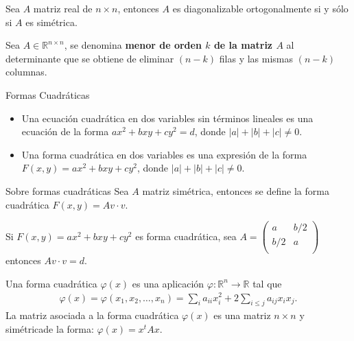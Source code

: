 \begin{Teo}
Sea $A$ matriz real de $n\times n$, entonces $A$ es diagonalizable ortogonalmente si y s\'olo si $A$ es sim\'etrica.
\end{Teo}


\begin{Def}
Sea $A\in\mathbb{R}^{n\times n}$, se denomina \textbf{menor de orden $k$ de la matriz $A$} al determinante que se obtiene de eliminar $\left(n-k\right)$ filas y las mismas $\left(n-k\right)$ columnas.
\end{Def}


\begin{Def} Formas Cuadr\'aticas
\begin{itemize}
\item[i) ] Una ecuaci\'on cuadr\'atica en dos variables sin t\'erminos lineales es una ecuaci\'on de la forma $ax^{2}+bxy+cy^{2}=d$, donde $|a|+|b|+|c|\neq0$.

\item[ii) ] Una forma cuadr\'atica en dos variables es una expresi\'on de la forma $F\left(x,y\right)=ax^{2}+bxy+cy^{2}$, donde $|a|+|b|+|c|\neq0$.
\end{itemize}
\end{Def}


\begin{Def} Sobre formas cuadr\'aticas
Sea $A$ matriz sim\'etrica, entonces se define la forma cuadr\'atica $F\left(x,y\right)=Av\cdot v$.
\end{Def}

\begin{Ejem}
Si $F\left(x,y\right)=ax^{2}+bxy+cy^{2}$ es forma cuadr\'atica, sea $A=\left(\begin{array}{cc}
a & b/2\\
b/2 & a\\
\end{array}
\right)$
entonces $Av\cdot v=d$.
\end{Ejem}


\begin{Def}
Una forma cuadr\'atica $\varphi\left(x\right)$ es una aplicaci\'on $\varphi:\mathbb{R}^{n}\rightarrow\mathbb{R}$ tal que
\begin{eqnarray*}
\varphi\left(x\right)=\varphi\left(x_{1},x_{2},\dots,x_{n}\right)=\sum_{i}a_{ii}x_{i}^{2}+2\sum_{i\leq j}a_{ij}x_{i}x_{j}.
\end{eqnarray*}
La matriz asociada a la forma cuadr\'atica $\varphi\left(x\right)$ es una matriz $n\times n$ y sim\'etricade la forma: $\varphi\left(x\right)=x^{t}Ax$.
\end{Def}

